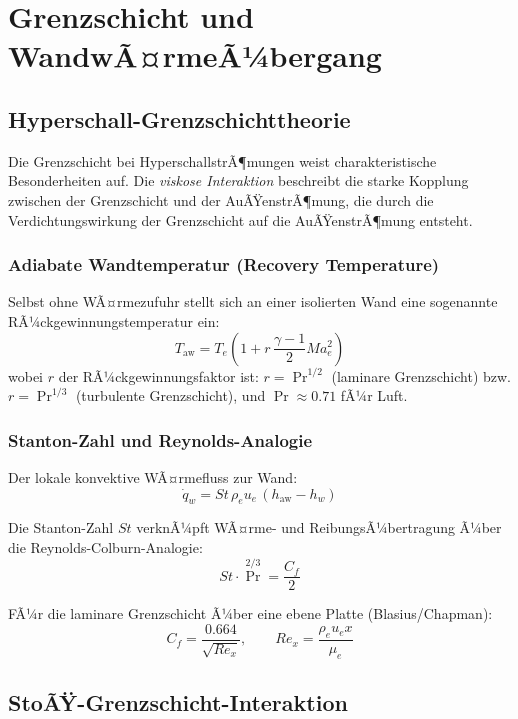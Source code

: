 ﻿\documentclass[12pt,a4paper]{article}
\newcommand{\Ma}{M\!a}
\begin{document}
\section{Grenzschicht und WandwÃ¤rmeÃ¼bergang}

\subsection{Hyperschall-Grenzschichttheorie}

Die Grenzschicht bei HyperschallstrÃ¶mungen weist charakteristische Besonderheiten auf.
Die \emph{viskose Interaktion} beschreibt die starke Kopplung zwischen der
Grenzschicht und der AuÃŸenstrÃ¶mung, die durch die Verdichtungswirkung der Grenzschicht
auf die AuÃŸenstrÃ¶mung entsteht.

\subsubsection{Adiabate Wandtemperatur (Recovery Temperature)}

Selbst ohne WÃ¤rmezufuhr stellt sich an einer isolierten Wand eine sogenannte
RÃ¼ckgewinnungstemperatur ein:
\[
  T_{\mathrm{aw}} = T_e \left(1 + r\,\frac{\gamma-1}{2}\Ma_e^2\right)
\]
wobei $r$ der RÃ¼ckgewinnungsfaktor ist: $r = \Pr^{1/2}$ (laminare Grenzschicht)
bzw. $r = \Pr^{1/3}$ (turbulente Grenzschicht), und $\Pr \approx 0.71$ fÃ¼r Luft.

\subsubsection{Stanton-Zahl und Reynolds-Analogie}

Der lokale konvektive WÃ¤rmefluss zur Wand:
\[
  \dot{q}_w = St\,\rho_e u_e\,(h_{\mathrm{aw}} - h_w)
\]

Die Stanton-Zahl $St$ verknÃ¼pft WÃ¤rme- und ReibungsÃ¼bertragung Ã¼ber die
Reynolds-Colburn-Analogie:
\[
  St \cdot \Pr^{2/3} = \frac{C_f}{2}
\]

FÃ¼r die laminare Grenzschicht Ã¼ber eine ebene Platte (Blasius/Chapman):
\[
  C_f = \frac{0.664}{\sqrt{Re_x}}, \qquad
  Re_x = \frac{\rho_e u_e x}{\mu_e}
\]

\subsection{StoÃŸ-Grenzschicht-Interaktion}
\end{document}
